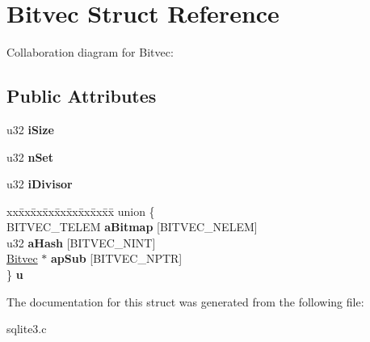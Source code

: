 \hypertarget{structBitvec}{}\section{Bitvec Struct Reference}
\label{structBitvec}


Collaboration diagram for Bitvec\+:
\subsection*{Public Attributes}
\begin{DoxyCompactItemize}
\item 
u32 {\bfseries i\+Size}\hypertarget{structBitvec_ab36df8ece98aee080bae6de28c237de8}{}\label{structBitvec_ab36df8ece98aee080bae6de28c237de8}

\item 
u32 {\bfseries n\+Set}\hypertarget{structBitvec_ad6811debae9b972f2d94d667e994e3f6}{}\label{structBitvec_ad6811debae9b972f2d94d667e994e3f6}

\item 
u32 {\bfseries i\+Divisor}\hypertarget{structBitvec_a22cdb23eb424e07b6ce922de018a83d9}{}\label{structBitvec_a22cdb23eb424e07b6ce922de018a83d9}

\item 
\begin{tabbing}
xx\=xx\=xx\=xx\=xx\=xx\=xx\=xx\=xx\=\kill
union \{\\
\>BITVEC\_TELEM {\bfseries aBitmap} \mbox{[}BITVEC\_NELEM\mbox{]}\\
\>u32 {\bfseries aHash} \mbox{[}BITVEC\_NINT\mbox{]}\\
\>\hyperlink{structBitvec}{Bitvec} $\ast$ {\bfseries apSub} \mbox{[}BITVEC\_NPTR\mbox{]}\\
\} {\bfseries u}\hypertarget{structBitvec_a580a692d761462ea1576d1fdcb6d97fa}{}\label{structBitvec_a580a692d761462ea1576d1fdcb6d97fa}
\\

\end{tabbing}\end{DoxyCompactItemize}


The documentation for this struct was generated from the following file\+:\begin{DoxyCompactItemize}
\item 
sqlite3.\+c\end{DoxyCompactItemize}
